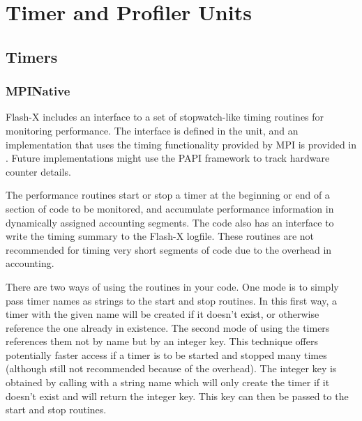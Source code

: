 \chapter{Timer and Profiler Units}
\label{Chp:Profiler and Timer Units}

\section{Timers}\label{Sec:Timers Unit}



\subsection{MPINative}
\label{Sec:MPINative}
Flash-X includes an interface to a set of stopwatch-like timing
routines for monitoring performance.  The interface is defined in the
 unit, and an implementation that uses the timing 
functionality provided by MPI is provided in .  
Future implementations might use the PAPI framework to track hardware counter 
details.  


The performance routines start or stop a timer at the beginning or end
of a section of code to be monitored, and accumulate performance
information in dynamically assigned accounting segments.  The code
also has an interface to write the timing summary to the Flash-X
logfile.  These routines are not recommended for timing very short
segments of code due to the overhead in accounting.

There are two ways of using the  routines in your code.
One mode is to simply pass timer names as strings to the start and
stop routines.  In this first way, a timer with the given name will be
created if it doesn't exist, or otherwise reference the one already in
existence.  The second mode of using the timers references them not by
name but by an integer key.  This technique offers potentially faster access if
a timer is to be started and stopped many times (although still not
recommended because of the overhead).  The integer key is obtained by
calling with a string name  which
will only create the timer if it doesn't exist and will return the
integer key.  This key can then be passed to the start and stop
routines.


